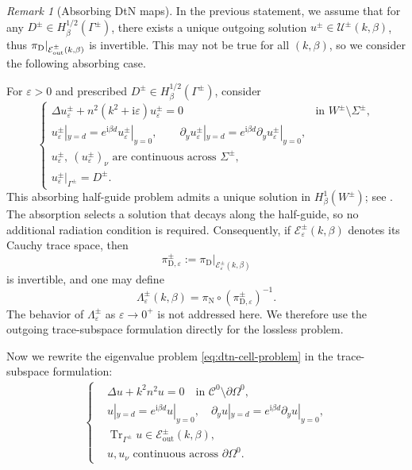 \documentclass[11pt,fleqn]{article}
\newcommand{\ii}{\mathrm{i}}
\theoremstyle{definition}
\theoremstyle{remark}
\newtheorem{remark}{Remark}
\begin{document}
\begin{remark}[Absorbing DtN maps]
In the previous statement, we assume that for any $D^\pm \in H^{1/2}_\beta(\Gamma^\pm)$, there exists a unique outgoing solution $u^\pm \in \mathcal U^\pm(k,\beta)$, thus $\pi_\mathrm{D}|_{\mathcal E^\pm_{\rm out}(k,\beta)}$ is invertible. This may not be true for all $(k,\beta)$, so we consider the following absorbing case.

For $\varepsilon>0$ and prescribed
$D^\pm\in H^{1/2}_\beta(\Gamma^\pm)$, consider
\[
\begin{cases}
\Delta u_\varepsilon^\pm
+n^2(k^2+\ii\varepsilon)u_\varepsilon^\pm=0
& \text{in }W^\pm\setminus\Sigma^\pm,\\
u_\varepsilon^\pm|_{y=d}
=e^{\ii\beta d}u_\varepsilon^\pm|_{y=0},
\qquad
\partial_yu_\varepsilon^\pm|_{y=d}
=e^{\ii\beta d}\partial_yu_\varepsilon^\pm|_{y=0},\\
u_\varepsilon^\pm,\ (u_\varepsilon^\pm)_\nu
\text{ are continuous across }\Sigma^\pm,\\
u_\varepsilon^\pm|_{\Gamma^\pm}=D^\pm .
\end{cases}
\]
This absorbing half-guide problem admits a unique solution in
$H^1_\beta(W^\pm)$; see
\cite{JolyLiFliss2006,Coatleven2012}. The absorption selects a solution
that decays along the half-guide, so no additional radiation condition
is required.
Consequently, if $\mathcal E^\pm_\varepsilon(k,\beta)$ denotes its
Cauchy trace space, then
\[
\pi^\pm_{\mathrm{D},\varepsilon}
:=
\left.\pi_\mathrm{D}\right|_{\mathcal E^\pm_\varepsilon(k,\beta)}
\]
is invertible, and one may define
\[
\Lambda^\pm_\varepsilon(k,\beta)
=
\pi_\mathrm{N}\circ
\left(\pi^\pm_{\mathrm{D},\varepsilon}\right)^{-1}.
\]
The behavior of $\Lambda^\pm_\varepsilon$ as
$\varepsilon\to0^+$ is not addressed here. We therefore use the
outgoing trace-subspace formulation directly for the lossless problem.
\end{remark}

Now we rewrite
the eigenvalue problem \eqref{eq:dtn-cell-problem} in the trace-subspace formulation:
\begin{align}
\begin{cases}
  &\Delta u + k^2 n^2 u = 0 \quad \text{in } \mathcal{C}^0\setminus \partial \Omega^0,\\
  &u|_{y = d} = e^{\ii\beta d} u|_{y = 0}, \quad \partial_y u|_{y = d} = e^{\ii\beta d} \partial_y u|_{y = 0},\\
  &\operatorname{Tr}_{\Gamma^\pm} u \in \mathcal{E}^\pm_{\mathrm{out}}(k,\beta),\\
  &u, u_\nu \text{ continuous across } \partial \Omega^0.
\end{cases}
\label{eq:trace-subspace-cell-tep}
\end{align}
\end{document}
